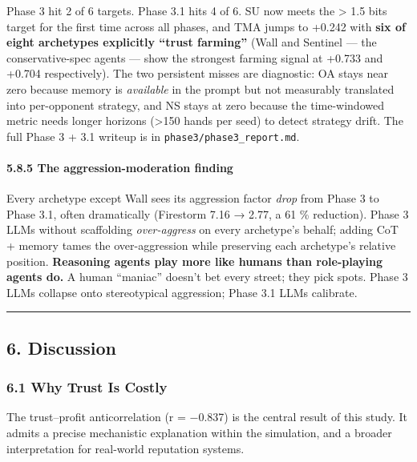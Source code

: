 \documentclass[
]{article}
\begin{document}
Phase 3 hit 2 of 6 targets. Phase 3.1 hits 4 of 6. SU now meets the
\textgreater{} 1.5 bits target for the first time across all phases, and
TMA jumps to +0.242 with \textbf{six of eight archetypes explicitly
``trust farming''} (Wall and Sentinel --- the conservative-spec agents
--- show the strongest farming signal at +0.733 and +0.704
respectively). The two persistent misses are diagnostic: OA stays near
zero because memory is \emph{available} in the prompt but not measurably
translated into per-opponent strategy, and NS stays at zero because the
time-windowed metric needs longer horizons (\textgreater150 hands per
seed) to detect strategy drift. The full Phase 3 + 3.1 writeup is in
\texttt{phase3/phase3\_report.md}.

\hypertarget{the-aggression-moderation-finding}{%
\paragraph{5.8.5 The aggression-moderation
finding}\label{the-aggression-moderation-finding}}

Every archetype except Wall sees its aggression factor \emph{drop} from
Phase 3 to Phase 3.1, often dramatically (Firestorm 7.16 → 2.77, a 61 \%
reduction). Phase 3 LLMs without scaffolding \emph{over-aggress} on
every archetype's behalf; adding CoT + memory tames the over-aggression
while preserving each archetype's relative position. \textbf{Reasoning
agents play more like humans than role-playing agents do.} A human
``maniac'' doesn't bet every street; they pick spots. Phase 3 LLMs
collapse onto stereotypical aggression; Phase 3.1 LLMs calibrate.

\begin{center}\rule{0.5\linewidth}{0.5pt}\end{center}

\hypertarget{discussion}{%
\subsection{6. Discussion}\label{discussion}}

\hypertarget{why-trust-is-costly}{%
\subsubsection{6.1 Why Trust Is Costly}\label{why-trust-is-costly}}

The trust--profit anticorrelation (r = −0.837) is the central result of
this study. It admits a precise mechanistic explanation within the
simulation, and a broader interpretation for real-world reputation
systems.
\end{document}
